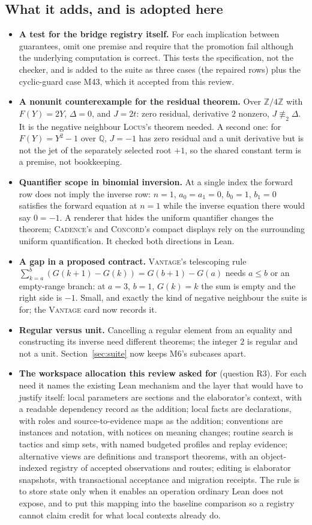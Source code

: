 \documentclass[11pt,a4paper]{article}
\newcommand{\code}[1]{\texttt{\detokenize{#1}}}
\newcommand{\Lc}{\textsc{Locus}}
\newcommand{\Cd}{\textsc{Cadence}}
\newcommand{\Cc}{\textsc{Concord}}
\newcommand{\Vt}{\textsc{Vantage}}
\newcommand{\Z}{\mathbb Z}
\newcommand{\Q}{\mathbb Q}
\theoremstyle{definition}
\begin{document}
\subsection{What it adds, and is adopted here}
\begin{itemize}
\item \textbf{A test for the bridge registry itself.} For each implication between guarantees, omit one premise and require that the promotion fail although the underlying computation is correct. This tests the specification, not the checker, and is added to the suite as three cases (the repaired rows) plus the cyclic-guard case M43, which it accepted from this review.
\item \textbf{A nonunit counterexample for the residual theorem.} Over $\Z/4\Z$ with $F(Y)=2Y$, $\Delta=0$, and $J=2t$: zero residual, derivative $2$ nonzero, $J\not\equiv_2\Delta$. It is the negative neighbour \Lc's theorem needed. A second one: for $F(Y)=Y^2-1$ over $\Q$, $J=-1$ has zero residual and a unit derivative but is not the jet of the separately selected root $+1$, so the shared constant term is a premise, not bookkeeping.
\item \textbf{Quantifier scope in binomial inversion.} At a single index the forward row does not imply the inverse row: $n=1$, $a_0=a_1=0$, $b_0=1$, $b_1=0$ satisfies the forward equation at $n=1$ while the inverse equation there would say $0=-1$. A renderer that hides the uniform quantifier changes the theorem; \Cd's and \Cc's compact displays rely on the surrounding uniform quantification. It checked both directions in Lean.
\item \textbf{A gap in a proposed contract.} \Vt's telescoping rule $\sum_{k=a}^{b}(G(k+1)-G(k))=G(b+1)-G(a)$ needs $a\le b$ or an empty-range branch: at $a=3$, $b=1$, $G(k)=k$ the sum is empty and the right side is $-1$. Small, and exactly the kind of negative neighbour the suite is for; the \Vt{} card now records it.
\item \textbf{Regular versus unit.} Cancelling a regular element from an equality and constructing its inverse need different theorems; the integer $2$ is regular and not a unit. Section~\ref{sec:suite} now keeps M6's subcases apart.
\item \textbf{The workspace allocation this review asked for} (question R3). For each need it names the existing Lean mechanism and the layer that would have to justify itself: local parameters are sections and the elaborator's context, with a readable dependency record as the addition; local facts are \code{have} declarations, with roles and source-to-evidence maps as the addition; conventions are instances and notation, with notices on meaning changes; routine search is tactics and simp sets, with named budgeted profiles and replay evidence; alternative views are definitions and transport theorems, with an object-indexed registry of accepted observations and routes; editing is elaborator snapshots, with transactional acceptance and migration receipts. The rule is to store state only when it enables an operation ordinary Lean does not expose, and to put this mapping into the baseline comparison so a registry cannot claim credit for what local contexts already do.

\end{itemize}
\end{document}
